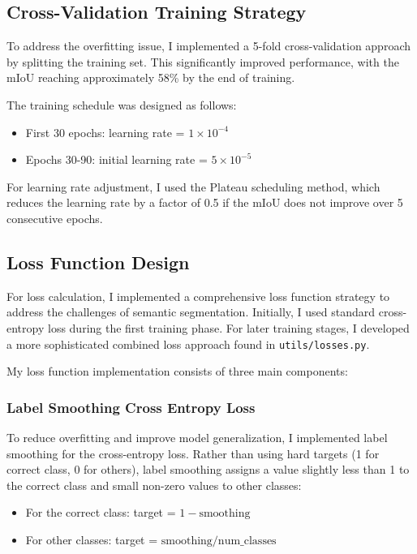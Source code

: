 \documentclass[]{article}
\begin{document}
\subsection{Cross-Validation Training Strategy}
To address the overfitting issue, I implemented a 5-fold cross-validation approach by splitting the training set. This significantly improved performance, with the mIoU reaching approximately 58\% by the end of training.

The training schedule was designed as follows:
\begin{itemize}
    \item First 30 epochs: learning rate = $1 \times 10^{-4}$
    \item Epochs 30-90: initial learning rate = $5 \times 10^{-5}$
\end{itemize}

For learning rate adjustment, I used the Plateau scheduling method, which reduces the learning rate by a factor of 0.5 if the mIoU does not improve over 5 consecutive epochs.

\subsection{Loss Function Design}

For loss calculation, I implemented a comprehensive loss function strategy to address the challenges of semantic segmentation. Initially, I used standard cross-entropy loss during the first training phase. For later training stages, I developed a more sophisticated combined loss approach found in \texttt{utils/losses.py}.

My loss function implementation consists of three main components:

\subsubsection{Label Smoothing Cross Entropy Loss}
To reduce overfitting and improve model generalization, I implemented label smoothing for the cross-entropy loss. Rather than using hard targets (1 for correct class, 0 for others), label smoothing assigns a value slightly less than 1 to the correct class and small non-zero values to other classes:

\begin{itemize}
    \item For the correct class: target = $1 - \text{smoothing}$
    \item For other classes: target = $\text{smoothing} / \text{num\_classes}$
\end{itemize}
\end{document}
